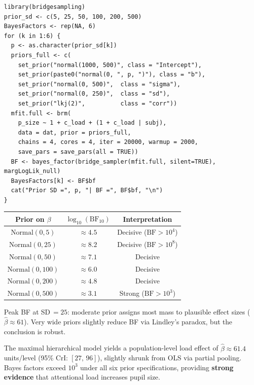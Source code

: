 \documentclass[12pt,a4paper]{article}
\begin{document}
\begin{lstlisting}
library(bridgesampling)
prior_sd <- c(5, 25, 50, 100, 200, 500)
BayesFactors <- rep(NA, 6)
for (k in 1:6) {
  p <- as.character(prior_sd[k])
  priors_full <- c(
    set_prior("normal(1000, 500)", class = "Intercept"),
    set_prior(paste0("normal(0, ", p, ")"), class = "b"),
    set_prior("normal(0, 500)",  class = "sigma"),
    set_prior("normal(0, 250)",  class = "sd"),
    set_prior("lkj(2)",          class = "corr"))
  mfit.full <- brm(
    p_size ~ 1 + c_load + (1 + c_load | subj),
    data = dat, prior = priors_full,
    chains = 4, cores = 4, iter = 20000, warmup = 2000,
    save_pars = save_pars(all = TRUE))
  BF <- bayes_factor(bridge_sampler(mfit.full, silent=TRUE), margLogLik_null)
  BayesFactors[k] <- BF$bf
  cat("Prior SD =", p, "| BF =", BF$bf, "\n")
}
\end{lstlisting}

\begin{tcolorbox}[resultbox, title={Bayes Factor Results -- Prior Sensitivity}]
\begin{center}
\renewcommand{\arraystretch}{1.4}
\begin{tabular}{ccc}
  \toprule
  \textbf{Prior on $\beta$} & \textbf{$\log_{10}(\mathrm{BF}_{10})$} & \textbf{Interpretation} \\
  \midrule
  $\mathrm{Normal}(0,5)$   & $\approx4.5$ & Decisive ($\mathrm{BF}>10^4$) \\
  $\mathrm{Normal}(0,25)$  & $\approx8.2$ & Decisive ($\mathrm{BF}>10^8$) \\
  $\mathrm{Normal}(0,50)$  & $\approx7.1$ & Decisive \\
  $\mathrm{Normal}(0,100)$ & $\approx6.0$ & Decisive \\
  $\mathrm{Normal}(0,200)$ & $\approx4.8$ & Decisive \\
  $\mathrm{Normal}(0,500)$ & $\approx3.1$ & Strong ($\mathrm{BF}>10^3$) \\
  \bottomrule
\end{tabular}
\end{center}
\vspace{4pt}
\small Peak BF at SD$\,=25$: moderate prior assigns most mass to plausible effect sizes ($\hat\beta\approx61$). Very wide priors slightly reduce BF via Lindley's paradox, but the conclusion is robust.
\end{tcolorbox}

\begin{tcolorbox}[notebox, title={Conclusion}]
The maximal hierarchical model yields a population-level load effect of $\hat{\beta}\approx61.4$ units/level (95\% CrI: $[27,\,96]$), slightly shrunk from OLS via partial pooling. Bayes factors exceed $10^3$ under all six prior specifications, providing \textbf{strong evidence} that attentional load increases pupil size.
\end{tcolorbox}
\end{document}
